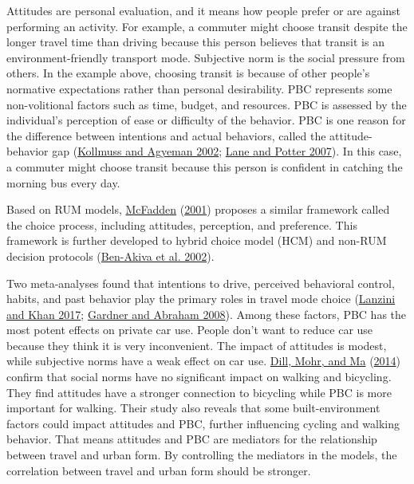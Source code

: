 \documentclass[
  12pt,
]{article}
\begin{document}
Attitudes are personal evaluation, and it means how people prefer or are against performing an activity. For example, a commuter might choose transit despite the longer travel time than driving because this person believes that transit is an environment-friendly transport mode. Subjective norm is the social pressure from others. In the example above, choosing transit is because of other people's normative expectations rather than personal desirability. PBC represents some non-volitional factors such as time, budget, and resources. PBC is assessed by the individual's perception of ease or difficulty of the behavior. PBC is one reason for the difference between intentions and actual behaviors, called the attitude-behavior gap (\protect\hyperlink{ref-kollmussMindGapWhy2002}{Kollmuss and Agyeman 2002}; \protect\hyperlink{ref-laneAdoptionCleanerVehicles2007}{Lane and Potter 2007}). In this case, a commuter might choose transit because this person is confident in catching the morning bus every day.

Based on RUM models, \protect\hyperlink{ref-mcfaddenEconomicChoices2001}{McFadden} (\protect\hyperlink{ref-mcfaddenEconomicChoices2001}{2001}) proposes a similar framework called the choice process, including attitudes, perception, and preference. This framework is further developed to hybrid choice model (HCM) and non-RUM decision protocols (\protect\hyperlink{ref-ben-akivaHybridChoiceModels2002}{Ben-Akiva et al. 2002}).

Two meta-analyses found that intentions to drive, perceived behavioral control, habits, and past behavior play the primary roles in travel mode choice (\protect\hyperlink{ref-lanziniSheddingLightPsychological2017}{Lanzini and Khan 2017}; \protect\hyperlink{ref-gardnerPsychologicalCorrelatesCar2008}{Gardner and Abraham 2008}). Among these factors, PBC has the most potent effects on private car use. People don't want to reduce car use because they think it is very inconvenient. The impact of attitudes is modest, while subjective norms have a weak effect on car use. \protect\hyperlink{ref-dillHowCanPsychological2014}{Dill, Mohr, and Ma} (\protect\hyperlink{ref-dillHowCanPsychological2014}{2014}) confirm that social norms have no significant impact on walking and bicycling. They find attitudes have a stronger connection to bicycling while PBC is more important for walking. Their study also reveals that some built-environment factors could impact attitudes and PBC, further influencing cycling and walking behavior. That means attitudes and PBC are mediators for the relationship between travel and urban form. By controlling the mediators in the models, the correlation between travel and urban form should be stronger.
\end{document}
